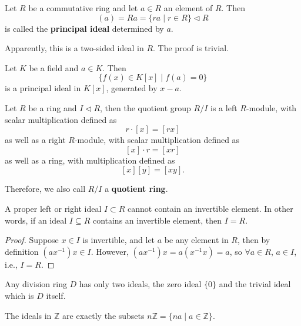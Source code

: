 \documentclass[12pt, a4paper, titlepage]{report}
\begin{document}
\begin{defn}
  Let $R$ be a commutative ring and let $a \in R$ an element of $R$. Then
  \[
    (a) = Ra = \{ ra \mid r \in R \} \lhd R
  \]
  is called the \textbf{principal ideal} determined by $a$.
\end{defn}

\begin{rem}
  Apparently, this is a two-sided ideal in $R$. The proof is trivial.
\end{rem}

\begin{exmp}
  Let $K$ be a field and $a \in K$. Then
  \[
    \{ f(x) \in K[x] \mid f(a) = 0 \}
  \]
  is a principal ideal in $K[x]$, generated by $x - a$.
\end{exmp}

\begin{lem}
  Let $R$ be a ring and $I \lhd R$, then the quotient group $R/I$ is a left $R$-module, with
  scalar multiplication defined as
  \[
    r \cdot [x] = [rx]
  \]
  as well as a right $R$-module, with scalar multiplication defined as
  \[
    [x] \cdot r = [xr]
  \]
  as well as a ring, with multiplication defined as
  \[
    [x][y] = [xy].
  \]
\end{lem}

\begin{rem}
  Therefore, we also call $R/I$ a \textbf{quotient ring}.
\end{rem}

\begin{lem}
  A proper left or right ideal $I \subset R$ cannot contain an invertible element. In other words, if
  an ideal $I \subseteq R$ contains an invertible element, then $I = R$.
\end{lem}

\begin{proof}
  Suppose $x \in I$ is invertible, and let $a$ be any element in $R$, then by definition $(ax^{-1})x \in I$.
  However, $(ax^{-1})x = a(x^{-1}x) = a$, so $\forall a \in R$, $a \in I$, i.e., $I = R$.
\end{proof}

\begin{cor}
  Any division ring $D$ has only two ideals, the zero ideal $\{0\}$ and the trivial ideal which is $D$ itself.
\end{cor}

\begin{rem}
  The ideals in $\mathbb{Z}$ are exactly the subsets $n\mathbb{Z} = \{ na \mid a \in \mathbb{Z} \}$.
\end{rem}
\end{document}
